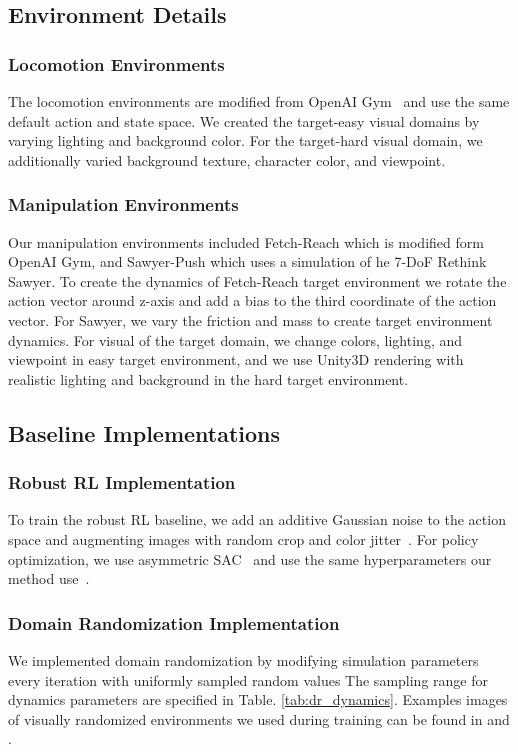 \subsection{Environment Details}

\subsubsection{Locomotion Environments}
The locomotion environments are modified from OpenAI Gym~\citep{brockman2016openai} and use the same default action and state space. We created the target-easy visual domains by varying lighting and background color.  For the target-hard visual domain, we additionally varied background texture, character color, and viewpoint.

\subsubsection{Manipulation Environments}
Our manipulation environments included Fetch-Reach which is modified form OpenAI Gym, and Sawyer-Push which uses a simulation of he 7-DoF Rethink Sawyer. To create the dynamics of Fetch-Reach target environment we rotate the action vector around z-axis and add a bias to the third coordinate of the action vector. For Sawyer, we vary the friction and mass to create target environment dynamics. For visual of the target domain, we change colors,  lighting, and viewpoint in easy target environment, and we use Unity3D rendering with realistic lighting and background in the hard target environment.


\subsection{Baseline Implementations}

\subsubsection{Robust RL Implementation}
To train the robust RL baseline, we add an additive Gaussian noise to the action space and augmenting images with random crop and color jitter~\citep{laskin2020reinforcement}. 
For policy optimization, we use asymmetric SAC~\citep{pinto2017asymmetric} and use the same hyperparameters our method use~.

\subsubsection{Domain Randomization Implementation}
\label{sec:dr_implementation}
We implemented domain randomization by modifying simulation parameters every iteration with uniformly sampled random values The sampling range for dynamics parameters are specified in Table. \ref{tab:dr_dynamics}. Examples images of visually randomized environments we used during training can be found in  and . 

